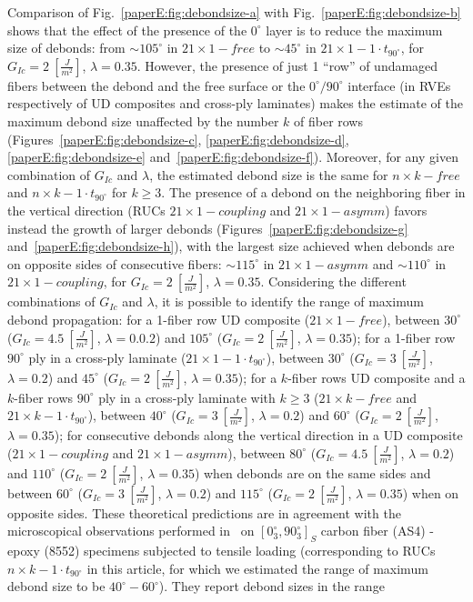 Comparison of Fig.~\ref{paperE:fig:debondsize-a} with Fig.~\ref{paperE:fig:debondsize-b} shows that the effect of the presence of the $0^{\circ}$ layer is to reduce the maximum size of debonds: from $\sim105^{\circ}$ in $21\times 1-free$ to $\sim45^{\circ}$ in $21\times 1-1\cdot t_{90^{\circ}}$, for $G_{Ic}=2\ \left[\frac{J}{m^{2}}\right]$, $\lambda=0.35$. However, the presence of just 1 ``row'' of undamaged fibers between the debond and the free surface or the $0^{\circ}/90^{\circ}$ interface (in RVEs respectively of UD composites and cross-ply laminates) makes the estimate of the maximum debond size unaffected by the number $k$ of fiber rows (Figures~\ref{paperE:fig:debondsize-c}, \ref{paperE:fig:debondsize-d}, \ref{paperE:fig:debondsize-e} and~\ref{paperE:fig:debondsize-f}). Moreover, for any given combination of $G_{Ic}$ and $\lambda$, the estimated debond size is the same for $n\times k-free$ and $n\times k-1\cdot t_{90^{\circ}}$ for $k\geq3$. The presence of a debond on the neighboring fiber in the vertical direction (RUCs $21\times 1-coupling$ and $21\times 1-asymm$) favors instead the growth of larger debonds (Figures~\ref{paperE:fig:debondsize-g} and~\ref{paperE:fig:debondsize-h}), with the largest size achieved when debonds are on opposite sides of consecutive fibers: $\sim115^{\circ}$ in $21\times 1-asymm$ and $\sim110^{\circ}$ in $21\times 1-coupling$, for $G_{Ic}=2\ \left[\frac{J}{m^{2}}\right]$, $\lambda=0.35$. Considering the different combinations of $G_{Ic}$ and $\lambda$, it is possible to identify the range of maximum debond propagation: for a 1-fiber row UD composite ($21\times 1-free$), between $30^{\circ}$ ($G_{Ic}=4.5\ \left[\frac{J}{m^{2}}\right]$, $\lambda=0.0.2$) and $105^{\circ}$ ($G_{Ic}=2\ \left[\frac{J}{m^{2}}\right]$, $\lambda=0.35$); for a 1-fiber row $90^{\circ}$ ply in a cross-ply laminate ($21\times 1-1\cdot t_{90^{\circ}}$), between $30^{\circ}$ ($G_{Ic}=3\ \left[\frac{J}{m^{2}}\right]$, $\lambda=0.2$) and $45^{\circ}$ ($G_{Ic}=2\ \left[\frac{J}{m^{2}}\right]$, $\lambda=0.35$); for a $k$-fiber rows UD composite and a $k$-fiber rows $90^{\circ}$ ply in a cross-ply laminate with $k\geq3$ ($21\times k-free$ and $21\times k-1\cdot t_{90^{\circ}}$), between $40^{\circ}$ ($G_{Ic}=3\ \left[\frac{J}{m^{2}}\right]$, $\lambda=0.2$) and $60^{\circ}$ ($G_{Ic}=2\ \left[\frac{J}{m^{2}}\right]$, $\lambda=0.35$); for consecutive debonds along the vertical direction in a UD composite ($21\times 1-coupling$ and $21\times 1-asymm$), between $80^{\circ}$ ($G_{Ic}=4.5\ \left[\frac{J}{m^{2}}\right]$, $\lambda=0.2$) and $110^{\circ}$ ($G_{Ic}=2\ \left[\frac{J}{m^{2}}\right]$, $\lambda=0.35$) when debonds are on the same sides and between $60^{\circ}$ ($G_{Ic}=3\ \left[\frac{J}{m^{2}}\right]$, $\lambda=0.2$) and $115^{\circ}$ ($G_{Ic}=2\ \left[\frac{J}{m^{2}}\right]$, $\lambda=0.35$) when on opposite sides. These theoretical predictions are in agreement with the microscopical observations performed in~\cite{Correa2018} on $\left[0^{\circ}_{3},90^{\circ}_{3}\right]_{S}$ carbon fiber (AS4) - epoxy (8552) specimens subjected to tensile loading (corresponding to RUCs $n\times k-1\cdot t_{90^{\circ}}$ in this article, for which we estimated the range of maximum debond size to be $40^{\circ}-60^{\circ}$). They report debond sizes in the range 